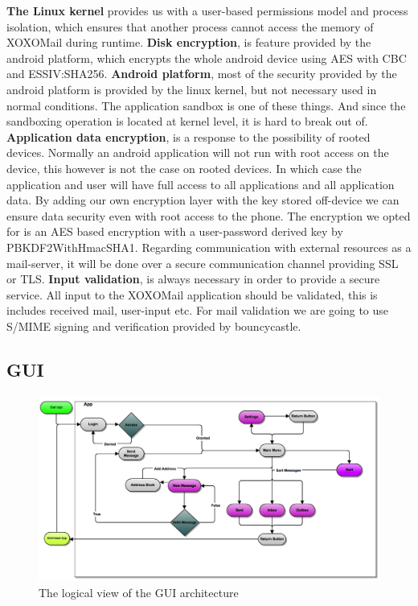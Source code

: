 \textbf{The Linux kernel} provides us with a user-based permissions model and process isolation, which ensures that another process cannot access the memory of XOXOMail during runtime.
\newline
\newline
\textbf{Disk encryption}, is feature provided by the android platform, which encrypts the whole android device using AES with CBC and ESSIV:SHA256.
\newline
\newline
\textbf{Android platform}, most of the security provided by the android platform is provided by the linux kernel, but not necessary used in normal conditions. The application sandbox is one of these things. And since the sandboxing operation is located at kernel level, it is hard to break out of. 
\newline
\newline
\textbf{Application data encryption}, is a response to the possibility of rooted devices. Normally an android application will not run with root access on the device, this however is not the case on rooted devices. In which case the application and user will have full access to all applications and all application data. By adding our own encryption layer with the key stored off-device we can ensure data security even with root access to the phone. The encryption we opted for is an AES based encryption with a user-password derived key by PBKDF2WithHmacSHA1. 
Regarding communication with external resources as a mail-server, it will be done over a secure communication channel providing SSL or TLS. 
\newline
\newline
\textbf{Input validation}, is always necessary in order to provide a secure service. All input to the XOXOMail application should be validated, this is includes received mail, user-input etc. For mail validation we are going to use S/MIME signing and verification provided by bouncycastle. 



\subsection{GUI}
\begin{figure}
	\includegraphics[width=\textwidth]{Android_GUI_flow_chart_2}
	\caption{The logical view of the GUI architecture}
	\label{fig:logicalGUIview}
\end{figure}